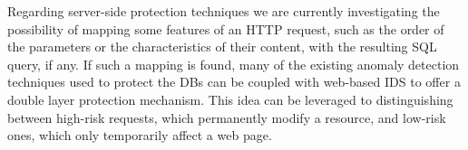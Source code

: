 Regarding server-side protection techniques we are currently investigating the possibility of mapping some features of an \ac{HTTP} request, such as the order of the parameters or the characteristics of their content, with the resulting \ac{SQL} query, if any. If such a mapping is found, many of the existing anomaly detection techniques used to protect the \acp{DB} can be coupled with web\hyp{}based \ac{IDS} to offer a double layer protection mechanism. This idea can be leveraged to distinguishing between high-risk requests, which permanently modify a resource, and low-risk ones, which only temporarily affect a web page.

